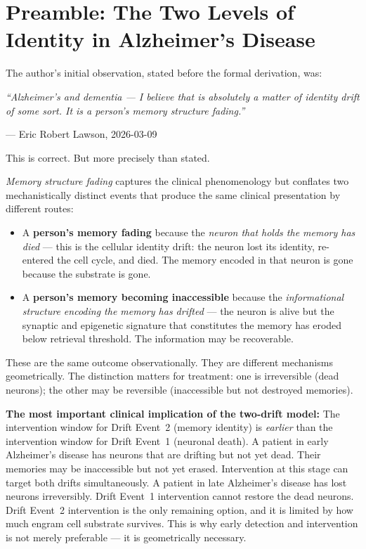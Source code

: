 \documentclass[12pt,a4paper]{article}
\newenvironment{warnenv}{%
  \begin{tcolorbox}[colback=red!5,colframe=warnbox,boxrule=1pt,
    arc=3pt,left=8pt,right=8pt,top=6pt,bottom=6pt,breakable]}{%
  \end{tcolorbox}}
\newenvironment{derivenv}{%
  \begin{tcolorbox}[colback=lightgray,colframe=midgray,boxrule=0.5pt,
    arc=3pt,left=8pt,right=8pt,top=6pt,bottom=6pt,breakable]}{%
  \end{tcolorbox}}
\begin{document}
\newpage
\tableofcontents
\newpage

\section{Preamble: The Two Levels of Identity in
Alzheimer's Disease}

The author's initial observation, stated before the formal
derivation, was:

\begin{derivenv}
\textit{``Alzheimer's and dementia --- I believe that is
absolutely a matter of identity drift of some sort.
It is a person's memory structure fading.''}

\medskip
--- Eric Robert Lawson, 2026-03-09
\end{derivenv}

This is correct. But more precisely than stated.

\textit{Memory structure fading} captures the clinical
phenomenology but conflates two mechanistically distinct
events that produce the same clinical presentation by
different routes:

\begin{itemize}
  \item A \textbf{person's memory fading} because the
    \emph{neuron that holds the memory has died} --- this is
    the cellular identity drift: the neuron lost its
    identity, re-entered the cell cycle, and died. The
    memory encoded in that neuron is gone because the
    substrate is gone.
  \item A \textbf{person's memory becoming inaccessible}
    because the \emph{informational structure encoding
    the memory has drifted} --- the neuron is alive but
    the synaptic and epigenetic signature that constitutes
    the memory has eroded below retrieval threshold.
    The information may be recoverable.
\end{itemize}

These are the same outcome observationally. They are different
mechanisms geometrically. The distinction matters for
treatment: one is irreversible (dead neurons); the other may
be reversible (inaccessible but not destroyed memories).

\begin{warnenv}
\textbf{The most important clinical implication of the
two-drift model:} The intervention window for Drift
Event~2 (memory identity) is \emph{earlier} than the
intervention window for Drift Event~1 (neuronal death).
A patient in early Alzheimer's disease has neurons
that are drifting but not yet dead. Their memories
may be inaccessible but not yet erased. Intervention
at this stage can target both drifts simultaneously.
A patient in late Alzheimer's disease has lost neurons
irreversibly. Drift Event~1 intervention cannot restore
the dead neurons. Drift Event~2 intervention is the
only remaining option, and it is limited by how much
engram cell substrate survives. This is why early
detection and intervention is not merely preferable ---
it is geometrically necessary.
\end{warnenv}
\end{document}
